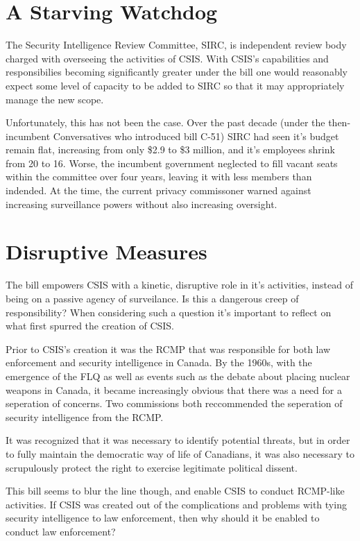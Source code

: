 \documentclass[a4paper, 11pt]{article} %
\begin{document}
\section*{A Starving Watchdog}
The Security Intelligence Review Committee, SIRC, is independent review body charged with overseeing the activities of CSIS. With CSIS's capabilities and responsibilies becoming significantly greater under the bill one would reasonably expect some level of capacity to be added to SIRC so that it may appropriately manage the new scope.

Unfortunately, this has not been the case. Over the past decade (under the then-incumbent Conversatives who introduced bill C-51) SIRC had seen it's budget remain flat, increasing from only \$2.9 to \$3 million, and it's employees shrink from 20 to 16. Worse, the incumbent government neglected to fill vacant seats within the committee over four years, leaving it with less members than indended. At the time, the current privacy commissoner warned against increasing surveillance powers without also increasing oversight. \cite{watchdog-starved}

\section*{Disruptive Measures}
The bill empowers CSIS with a kinetic, disruptive role in it's activities, instead of being on a passive agency of surveilance. Is this a dangerous creep of responsibility? When considering such a question it's important to reflect on what first spurred the creation of CSIS.

Prior to CSIS's creation it was the RCMP that was responsible for both law enforcement and security intelligence in Canada. By the 1960s, with the emergence of the FLQ as well as events such as the debate about placing nuclear weapons in Canada, it became increasingly obvious that there was a need for a seperation of concerns. Two commissions both reccommended the seperation of security intelligence from the RCMP.

It was recognized that it was necessary to identify potential threats, but in order to fully maintain the democratic way of life of Canadians, it was also necessary to scrupulously protect the right to exercise legitimate political dissent. \cite{history-of-csis}

This bill seems to blur the line though, and enable CSIS to conduct RCMP-like activities. If CSIS was created out of the complications and problems with tying security intelligence to law enforcement, then why should it be enabled to conduct law enforcement?
\end{document}
